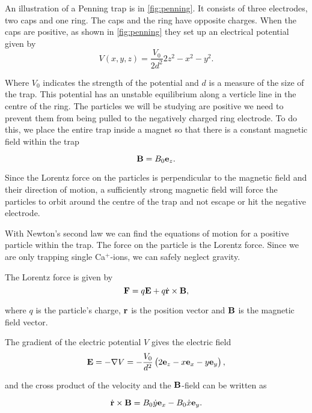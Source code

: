 An illustration of a Penning trap is in \autoref{fig:penning}. It
consists of three electrodes, two caps and one ring.
The caps and the ring have opposite charges. When the caps are positive, as shown in \autoref{fig:penning}
they set up an electrical potential given by
\begin{equation}
V(x, y, z) = \frac{V_0}{2d^2}{2z^2 - x^2 - y^2}.
\end{equation}

Where $V_0$ indicates the strength of the potential and $d$ is a measure of the size of the trap.
This potential has an unstable equilibrium along a verticle line in the centre of the ring.
The particles we will be studying are positive we need to prevent them from being pulled to the negatively
charged ring electrode. To do this, we place the entire trap inside a magnet so that there is a constant
magnetic field within the trap

\begin{equation}
\bold{B} = B_0 \bold{e}_z.
\end{equation}

Since the Lorentz force on the particles is perpendicular to the magnetic field and their direction of
motion, a sufficiently strong magnetic field will force the particles to orbit around the centre of the trap
and not escape or hit the negative electrode.

With Newton's second law we can find the equations of motion for a positive particle within the trap. The
force on the particle is the Lorentz force. Since we are only trapping
single Ca$^+$-ions, we can safely neglect gravity.

The Lorentz force is given by
\begin{equation}
\bold{F} = q\bold{E} + q\dot{\bold{r}} \times \bold{B},
\end{equation}

where $q$ is the particle's charge, $\bold{r}$ is the position vector and $\bold{B}$ is the magnetic field vector.

The gradient of the electric potential $V$ gives the electric field
\begin{equation}
\bold{E} = -\nabla V = -\frac{V_0}{d^2}\left(2 \bold{e}_z - x\bold{e}_x - y\bold{e}_y\right),
\end{equation}

and the cross product of the velocity and the $\bold{B}$-field can be written as

\begin{equation}
\dot{\bold{r}} \times \bold{B} = B_0 \dot{y} \bold{e}_x - B_0 \dot{x} \bold{e}_y.
\end{equation}

